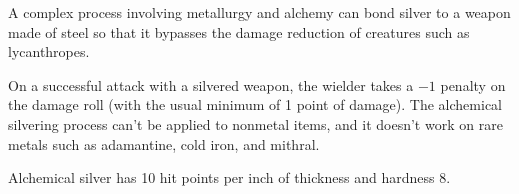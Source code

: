 A complex process involving metallurgy and alchemy can bond silver to a weapon made of steel so that it bypasses the damage reduction of creatures such as lycanthropes.

On a successful attack with a silvered weapon, the wielder takes a $-1$ penalty on the damage roll (with the usual minimum of 1 point of damage). The alchemical silvering process can't be applied to nonmetal items, and it doesn't work on rare metals such as adamantine, cold iron, and mithral.

Alchemical silver has 10 hit points per inch of thickness and hardness 8.
